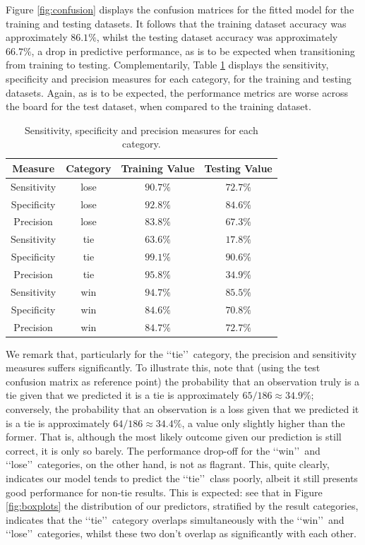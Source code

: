 \documentclass[12pt,paper=letter,leqno]{scrartcl}
\begin{document}
Figure \ref{fig:confusion} displays the confusion matrices for the fitted model for the training and testing datasets. It follows that the training dataset accuracy was approximately $86.1\%$, whilst the testing dataset accuracy was approximately $66.7\%$, a drop in predictive performance, as is to be expected when transitioning from training to testing. Complementarily, Table \ref{tab:categories} displays the sensitivity, specificity and precision measures for each category, for the training and testing datasets. Again, as is to be expected, the performance metrics are worse across the board for the test dataset, when compared to the training dataset.

\begin{table}[]
    \centering
    \begin{tabular}{cccc}
         \hline Measure & Category & Training Value & Testing Value \\ \hline
         Sensitivity & lose & $90.7\%$ & $72.7\%$ \\
         Specificity & lose & $92.8\%$ & $84.6\%$ \\
         Precision & lose & $83.8\%$ & $67.3\%$ \\
         Sensitivity & tie & $63.6\%$ & $17.8\%$\\
         Specificity & tie & $99.1\%$& $90.6\%$ \\
         Precision & tie & $95.8\%$ & $34.9\%$ \\
         Sensitivity & win & $94.7\%$ & $85.5\%$ \\
         Specificity & win & $84.6\%$ & $70.8\%$\\
         Precision & win & $84.7\%$ & $72.7\%$ \\ \hline
    \end{tabular}
    \caption{Sensitivity, specificity and precision measures for each category.}
    \label{tab:categories}
\end{table}

We remark that, particularly for the \lq\lq tie\rq\rq\ category, the precision and sensitivity measures suffers significantly. To illustrate this, note that (using the test confusion matrix as reference point) the probability that an observation truly is a tie given that we predicted it is a tie is approximately $65/186 \approx 34.9\%$; conversely, the probability that an observation is a loss given that we predicted it is a tie is approximately $64/186 \approx 34.4\%$, a value only slightly higher than the former. That is, although the most likely outcome given our prediction is still correct, it is only so barely. The performance drop-off for the \lq\lq win\rq\rq\ and \lq\lq lose\rq\rq\ categories, on the other hand, is not as flagrant. This, quite clearly, indicates our model tends to predict the \lq\lq tie\rq\rq\ class poorly, albeit it still presents good performance for non-tie results. This is expected: see that in Figure \ref{fig:boxplots} the distribution of our predictors, stratified by the result categories, indicates that the \lq\lq tie\rq\rq\ category overlaps simultaneously with the \lq\lq win\rq\rq\ and \lq\lq lose\rq\rq\ categories, whilst these two don't overlap as significantly with each other.
\end{document}
